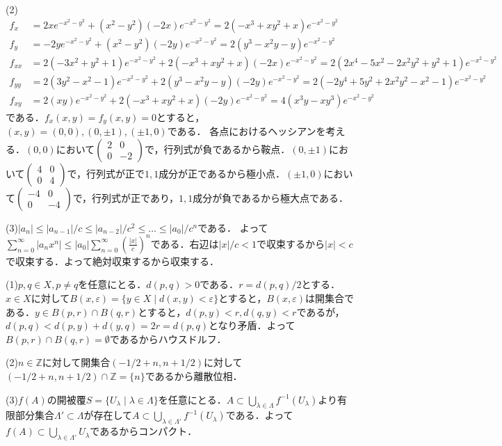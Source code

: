 \documentclass[
		book,
		head_space=20mm,
		foot_space=20mm,
		gutter=10mm,
		line_length=190mm
]{jlreq}
\begin{document}
(2)\begin{align}
	f_x&=2xe^{-x^2-y^2}+(x^2-y^2)(-2x)e^{-x^2-y^2}=2(-x^3+xy^2+x)e^{-x^2-y^2}\\
	f_y &=-2ye^{-x^2-y^2}+(x^2-y^2)(-2y)e^{-x^2-y^2}=2(y^3-x^2y-y)e^{-x^2-y^2}\\
	f_{xx}&=2(-3x^2+y^2+1)e^{-x^2-y^2}+2(-x^3+xy^2+x)(-2x)e^{-x^2-y^2}=2(2x^4-5x^2-2x^2y^2+y^2+1)e^{-x^2-y^2}\\
	f_{yy}&=2(3y^2-x^2-1)e^{-x^2-y^2}+2(y^3-x^2y-y)(-2y)e^{-x^2-y^2}=2(-2y^4+5y^2+2x^2y^2-x^2-1)e^{-x^2-y^2}\\
	f_{xy}&=2(xy)e^{-x^2-y^2}+2(-x^3+xy^2+x)(-2y)e^{-x^2-y^2}=4(x^3y-xy^3)e^{-x^2-y^2}
\end{align} 
である．$f_x(x,y)=f_y(x,y)=0$とすると，$(x,y)=(0,0),(0,\pm 1),(\pm 1,0)$である．
各点におけるヘッシアンを考える．$(0,0)$において$\begin{pmatrix}
	2 & 0\\
	0 & -2 
	\end{pmatrix}$で，行列式が負であるから鞍点．$(0,\pm 1)$において$\begin{pmatrix}
		4 & 0\\
		0 & 4
		\end{pmatrix}$で，行列式が正で$1,1$成分が正であるから極小点．$(\pm 1,0)$において$\begin{pmatrix}
		-4 & 0\\
		0 & -4
		\end{pmatrix}$で，行列式が正であり，$1,1$成分が負であるから極大点である．

(3)$|a_n|\le |a_{n-1}|/c\le|a_{n-2}|/c^2\le\dots\le |a_0|/c^n$である．
よって$\sum\limits_{n=0}^{\infty}|a_nx^n|\le |a_0|\sum\limits_{n=0}^{\infty}(\frac{|x|}{c})^n$である．右辺は$|x|/c <1$で収束するから$|x|<c$で収束する．よって絶対収束するから収束する．

(1)$p,q \in X,p\neq q$を任意にとる．$d(p,q)>0$である．$r=d(p,q)/2$とする．
$x \in X$に対して$B(x,\varepsilon)=\{ y \in X\mid d(x,y)<\varepsilon\}$とすると，$B(x , \varepsilon)$は開集合である．$y\in B(p,r)\cap B(q,r)$とすると，$d(p,y)<r,d(q,y)<r$であるが，$d(p,q)<d(p,y)+d(y,q)=2r=d(p,q)$となり矛盾．よって$B(p,r)\cap B(q,r)=\emptyset$であるからハウスドルフ．

(2)$n \in \mathbb{Z}$に対して開集合$(-1/2+n,n+1/2)$に対して$(-1/2+n,n+1/2) \cap \mathbb{Z}=\{ n\}$であるから離散位相．

(3)$f(A)$の開被覆$S=\{ U_{\lambda}\mid \lambda \in \Lambda\}$を任意にとる．$A \subset \bigcup\limits_{\lambda\in \Lambda}f^{-1}(U_\lambda)$より有限部分集合$\Lambda'\subset \Lambda$が存在して$A \subset \bigcup\limits_{\lambda\in \Lambda'}f^{-1}(U_\lambda)$である．よって$f(A)\subset \bigcup\limits_{\lambda\in \Lambda'}U_\lambda$であるからコンパクト．
\end{document}

